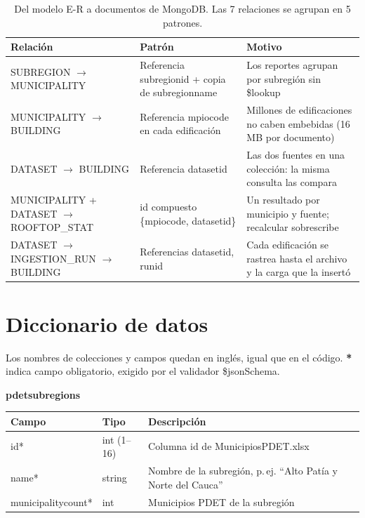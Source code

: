 \documentclass[11pt,a4paper]{article}
\newcommand{\brkus}{\textunderscore\allowbreak}
\newcommand{\f}[1]{{\ttfamily\let\_\brkus #1}}
\begin{document}
\begin{table}[H]
\centering\small
\caption{Del modelo E-R a documentos de MongoDB. Las 7 relaciones se agrupan en 5 patrones.}
\begin{tabularx}{\textwidth}{@{}>{\raggedright\arraybackslash}p{4.4cm} >{\raggedright\arraybackslash}p{4.3cm} L@{}}
\toprule
Relación & Patrón & Motivo \\
\midrule
SUBREGION $\rightarrow$ MUNICIPALITY & Referencia \f{subregion\_id} + copia de \f{subregion\_name} & Los reportes agrupan por subregión sin \f{\$lookup} \\
MUNICIPALITY $\rightarrow$ BUILDING & Referencia \f{mpio\_code} en cada edificación & Millones de edificaciones no caben embebidas (16 MB por documento) \\
DATASET $\rightarrow$ BUILDING & Referencia \f{dataset\_id} & Las dos fuentes en una colección: la misma consulta las compara \\
MUNICIPALITY + DATASET $\rightarrow$ ROOFTOP\_STAT & \f{\_id} compuesto \f{\{mpio\_code, dataset\_id\}} & Un resultado por municipio y fuente; recalcular sobrescribe \\
DATASET $\rightarrow$ INGESTION\_RUN $\rightarrow$ BUILDING & Referencias \f{dataset\_id}, \f{run\_id} & Cada edificación se rastrea hasta el archivo y la carga que la insertó \\
\bottomrule
\end{tabularx}
\end{table}

\section{Diccionario de datos}

Los nombres de colecciones y campos quedan en inglés, igual que en el código. \textbf{*} indica campo obligatorio, exigido por el validador \f{\$jsonSchema}.

\newcommand{\dict}[2]{%
\par\smallskip\textbf{\f{#1}}\par\nopagebreak
{\small\begin{tabularx}{\textwidth}{@{}p{3.3cm} p{3.4cm} L@{}}
\toprule Campo & Tipo & Descripción \\ \midrule #2 \bottomrule
\end{tabularx}}\par}

\dict{pdet\_subregions}{%
\f{\_id}* & int (1--16) & Columna \f{id} de \f{MunicipiosPDET.xlsx} \\
\f{name}* & string & Nombre de la subregión, p.\,ej. ``Alto Patía y Norte del Cauca'' \\
\f{municipality\_count}* & int & Municipios PDET de la subregión \\}
\end{document}
